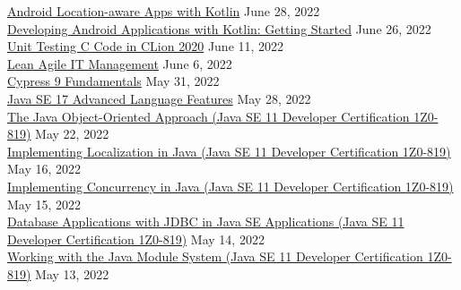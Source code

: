 \documentclass[10pt]{res} %
\begin{document}
\begin{resume}
\href{https://bjdelacruz.dev/files/certificates/pluralsight/Android_Location_aware_Apps_with_Kotlin.pdf}{\color{blue}Android Location-aware Apps with Kotlin} \hfill June 28, 2022 \\
\href{https://bjdelacruz.dev/files/certificates/pluralsight/Developing_Android_Applications_with_Kotlin_Getting_Started.pdf}{\color{blue}Developing Android Applications with Kotlin: Getting Started} \hfill June 26, 2022 \\
\href{https://bjdelacruz.dev/files/certificates/pluralsight/Unit_Testing_C_Code_in_CLion_2020.pdf}{\color{blue}Unit Testing C Code in CLion 2020} \hfill June 11, 2022 \\
\href{https://bjdelacruz.dev/files/certificates/pluralsight/Lean_Agile_IT_Management.pdf}{\color{blue}Lean Agile IT Management} \hfill June 6, 2022 \\
\href{https://bjdelacruz.dev/files/certificates/pluralsight/Cypress_9_Fundamentals.pdf}{\color{blue}Cypress 9 Fundamentals} \hfill May 31, 2022 \\
\href{https://bjdelacruz.dev/files/certificates/pluralsight/Java_SE_17_Advanced_Language_Features.pdf}{\color{blue}Java SE 17 Advanced Language Features} \hfill May 28, 2022 \\
\href{https://bjdelacruz.dev/files/certificates/pluralsight/4_The_Java_Object_Oriented_Approach_Java_SE_11_Developer_Certification_1Z0_819.pdf}{\color{blue}The Java Object-Oriented Approach (Java SE 11 Developer Certification 1Z0-819)} \hfill May 22, 2022 \\
\href{https://bjdelacruz.dev/files/certificates/pluralsight/9_Implementing_Localization_in_Java_Java_SE_11_Developer_Certification_1Z0_819.pdf}{\color{blue}Implementing Localization in Java (Java SE 11 Developer Certification 1Z0-819)} \hfill May 16, 2022 \\
\href{https://bjdelacruz.dev/files/certificates/pluralsight/7_Implementing_Concurrency_in_Java_Java_SE_11_Developer_Certification_1Z0_819.pdf}{\color{blue}Implementing Concurrency in Java (Java SE 11 Developer Certification 1Z0-819)} \hfill May 15, 2022 \\
\href{https://bjdelacruz.dev/files/certificates/pluralsight/13_Database_Applications_with_JDBC_in_Java_SE_Applications_Java_SE_11_Developer_Certification_1Z0_819.pdf}{\color{blue}Database Applications with JDBC in Java SE Applications (Java SE 11 Developer Certification 1Z0-819)} \hfill May 14, 2022 \\
\href{https://bjdelacruz.dev/files/certificates/pluralsight/11_Working_with_the_Java_Module_System_Java_SE_11_Developer_Certification_1Z0_819.pdf}{\color{blue}Working with the Java Module System (Java SE 11 Developer Certification 1Z0-819)} \hfill May 13, 2022 \\

\end{resume}
\end{document}
